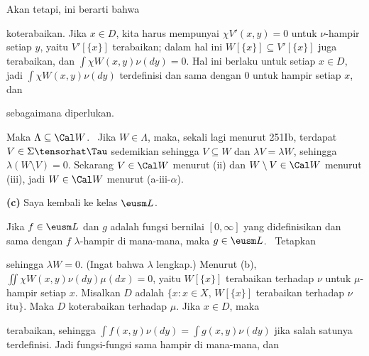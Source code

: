 {\noindent Akan tetapi, ini berarti bahwa


\noindent koterabaikan. Jika $x\in D$, kita harus mempunyai
$\chi V'(x,y)=0$ untuk $\nu$-hampir setiap $y$, yaitu $V'[\{x\}]$
terabaikan; dalam hal ini $W[\{x\}]\subseteq V'[\{x\}]$ juga terabaikan,
dan $\int\chi W(x,y)\nu(dy)=0$. Hal ini berlaku untuk setiap $x\in D$,
jadi $\int\chi W(x,y)\nu(dy)$ terdefinisi dan sama dengan $0$ untuk
hampir setiap $x$, dan


\noindent sebagaimana diperlukan.\ \Qed

\medskip

 Maka $\Lambda\subseteq\Cal W$. \Prf\ Jika
$W\in\Lambda$, maka, sekali lagi menurut 251Ib, terdapat
$V\in\Sigma\tensorhat\Tau$ sedemikian sehingga $V\subseteq W$ dan
$\lambda V=\lambda W$, sehingga $\lambda(W\setminus V)=0$. Sekarang
$V\in\Cal W$ menurut (ii) dan $W\setminus V\in\Cal W$ menurut (iii),
jadi $W\in\Cal W$ menurut (a-iii-$\alpha$).\ \Qed

\medskip

{\bf (c)} Saya kembali ke kelas $\eusm L$.

\medskip

 Jika $f\in\eusm L$ dan $g$ adalah fungsi bernilai
$[0,\infty]$ yang didefinisikan dan sama dengan $f\,\,\lambda$-hampir
di mana-mana, maka $g\in\eusm L$. \Prf\ Tetapkan


\noindent sehingga $\lambda W=0$. (Ingat bahwa $\lambda$ lengkap.)
Menurut (b), $\iint\chi W(x,y)\nu(dy)\mu(dx)=0$, yaitu $W[\{x\}]$
terabaikan terhadap $\nu$ untuk $\mu$-hampir setiap $x$. Misalkan $D$
adalah $\{x:x\in X,\,W[\{x\}]$ terabaikan terhadap $\nu$ itu$\}$. Maka $D$
koterabaikan terhadap $\mu$. Jika $x\in D$, maka


\noindent terabaikan, sehingga
$\int f(x,y)\nu(dy)=\int g(x,y)\nu(dy)$ jika salah satunya terdefinisi.
Jadi fungsi-fungsi
sama hampir di mana-mana, dan


}
